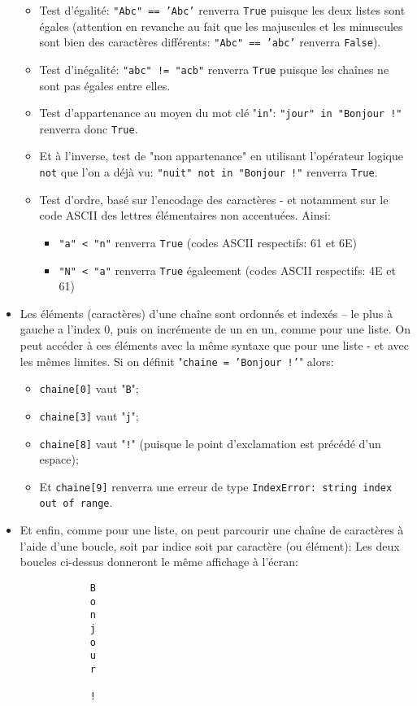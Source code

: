 \documentclass[12pt]{article}
\begin{document}
\begin{itemize}
		\begin{itemize}
			\item Test d'égalité: \texttt{"Abc" == 'Abc'} renverra \texttt{True} puisque les deux listes sont égales (attention en revanche au fait que les majuscules et les minuscules sont bien des caractères différents: \texttt{"Abc" == 'abc'} renverra \texttt{False}).
			\item Test d'inégalité: \texttt{"abc" != "acb"} renverra \texttt{True} puisque les chaînes ne sont pas égales entre elles.
			\item Test d'appartenance au moyen du mot clé "\texttt{in}": \texttt{"jour" in "Bonjour !"} renverra donc \texttt{True}.
			\item Et à l'inverse, test de "non appartenance" en utilisant l'opérateur logique \texttt{not} que l'on a déjà vu: \texttt{"nuit" not in "Bonjour !"} renverra \texttt{True}.
			\item Test d'ordre, basé sur l'encodage des caractères - et notamment sur le code ASCII des lettres élémentaires non accentuées. Ainsi:
			\begin{itemize}
				\item \texttt{"a" < "n"} renverra \texttt{True} (codes ASCII respectifs: 61 et 6E)
				\item \texttt{"N" < "a"} renverra \texttt{True} égaleement (codes ASCII respectifs: 4E et 61)
			\end{itemize}
		\end{itemize}
		\item Les éléments (caractères) d'une chaîne sont ordonnés et indexés -- le plus à gauche a l'index 0, puis on incrémente de un en un, comme pour une liste. On peut accéder à ces éléments avec la même syntaxe que pour une liste - et avec les mêmes limites. Si on définit "\texttt{chaine = 'Bonjour !'}" alors:
		\begin{itemize}
			\item \texttt{chaine[0]} vaut "\texttt{B}";
			\item \texttt{chaine[3]} vaut "\texttt{j}";
			\item \texttt{chaine[8]} vaut "\texttt{!}" (puisque le point d'exclamation est précédé d'un espace);
			\item Et \texttt{chaine[9]} renverra une erreur de type \texttt{IndexError: string index out of range}.
		\end{itemize}
		\item Et enfin, comme pour une liste, on peut parcourir une chaîne de caractères à l'aide d'une boucle, soit par indice soit par caractère (ou élément):
		Les deux boucles ci-dessus donneront le même affichage à l'écran:
		\begin{verbatim}
			B
			o
			n
			j
			o
			u
			r
			
			!
		\end{verbatim}
	\end{itemize}
	
\end{document}
